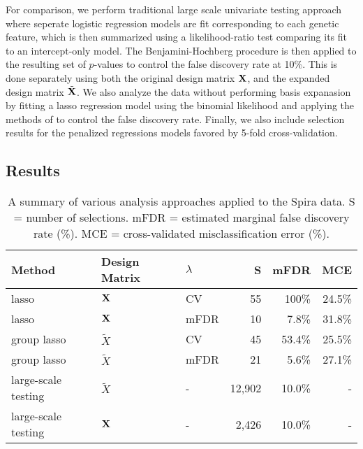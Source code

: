 For comparison, we perform traditional large scale univariate testing approach where seperate logistic regression models are fit corresponding to each genetic feature, which is then summarized using a likelihood-ratio test comparing its fit to an intercept-only model.  The Benjamini-Hochberg procedure is then applied to the resulting set of $p$-values to control the false discovery rate at 10\%.   This is done separately using both the original design matrix $\mathbf{X}$, and the expanded design matrix $\tilde{\mathbf{X}}$.  We also analyze the data without performing basis expanasion by fitting a lasso regression model using the binomial likelihood and applying the methods of \citet{Miller2019} to control the false discovery rate.  Finally, we also include selection results for the penalized regressions models favored by 5-fold cross-validation.

\subsection{Results}

\begin{table}[htb!]
\centering
\caption{\label{Tab:case-studies} A summary of various analysis approaches applied to the Spira data. S = number of selections.  mFDR = estimated marginal false discovery rate (\%). MCE = cross-validated misclassification error (\%).}
\vspace{.2cm}
\begin{tabular}{l l l r r r}
  \hline
  Method & Design Matrix & $\lambda$ & S & mFDR & MCE \\
  \hline
  lasso & $\mathbf{X}$ & CV & 55 & 100\% & 24.5\% \\
  lasso & $\mathbf{X}$ & mFDR & 10 & 7.8\%  & 31.8\% \\
  group lasso & $\tilde{X}$ & CV & 45 & 53.4\% & 25.5\% \\
  group lasso & $\tilde{X}$  & mFDR & 21 & 5.6\% & 27.1\% \\
  large-scale testing & $\tilde{X}$  & - & 12,902 & 10.0\% & - \\
  large-scale testing & $\mathbf{X}$ & - & 2,426 & 10.0\% & - \\
  \hline
\end{tabular}
\end{table}

